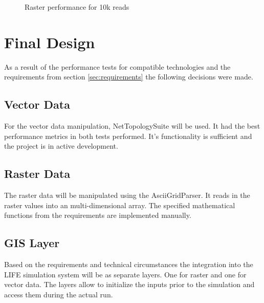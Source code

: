 \begin{figure}[H]
	\caption{Raster performance for 10k reads}
	\label{fig:raster_performace_best}
\end{figure}



\section{Final Design}
As a result of the performance tests for compatible technologies and the requirements from section \ref{sec:requirements} the following decisions were made.


\subsection{Vector Data}
For the vector data manipulation, NetTopologySuite will be used. It had the best performance metrics in both tests performed. It's functionality is sufficient and the project is in active development.


\subsection{Raster Data}
The raster data will be manipulated using the AsciiGridParser. It reads in the raster values into an multi-dimensional array. The specified mathematical functions from the requirements are implemented manually.


\subsection{GIS Layer}
Based on the requirements and technical circumstances the integration into the LIFE simulation system will be as separate layers. One for raster and one for vector data. The layers allow to initialize the inputs prior to the simulation and access them during the actual run.